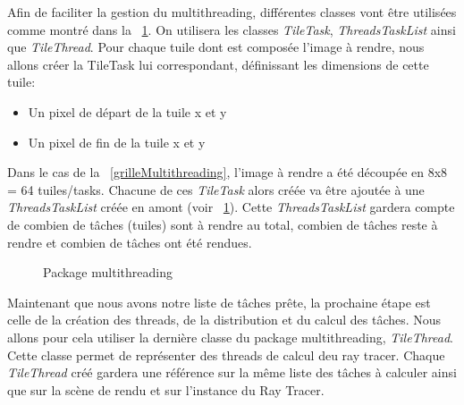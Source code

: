 \documentclass[11pt]{article}
\begin{document}
Afin de faciliter la gestion du multithreading, différentes classes vont être utilisées comme montré dans la \figurename\ \ref{packageMultithreading}. On utilisera les classes \textit{TileTask}, \textit{ThreadsTaskList} ainsi que \textit{TileThread}. Pour chaque tuile dont est composée l'image à rendre, nous allons créer la TileTask lui correspondant, définissant les dimensions de cette tuile:
\begin{itemize}
	\item {Un pixel de départ de la tuile x et y}
	\item {Un pixel de fin de la tuile x et y}
\end{itemize}
Dans le cas de la \figurename\ \ref{grilleMultithreading}, l'image à rendre a été découpée en 8x8 = 64 tuiles/tasks. Chacune de ces \textit{TileTask} alors créée va être ajoutée à une \textit{ThreadsTaskList} créée en amont (voir \figurename\ \ref{packageMultithreading}). Cette \textit{ThreadsTaskList} gardera compte de combien de tâches (tuiles) sont à rendre au total, combien de tâches reste à rendre et combien de tâches ont été rendues.

\begin{figure}[h!]

	\caption{Package multithreading}
	\label{packageMultithreading}
\end{figure}
\FloatBarrier

Maintenant que nous avons notre liste de tâches prête, la prochaine étape est celle de la création des threads, de la distribution et du calcul des tâches. Nous allons pour cela utiliser la dernière classe du package multithreading, \textit{TileThread}. Cette classe permet de représenter des threads de calcul deu ray tracer. Chaque \textit{TileThread} créé gardera une référence sur la même liste des tâches à calculer ainsi que sur la scène de rendu et sur l'instance du Ray Tracer.
\end{document}
